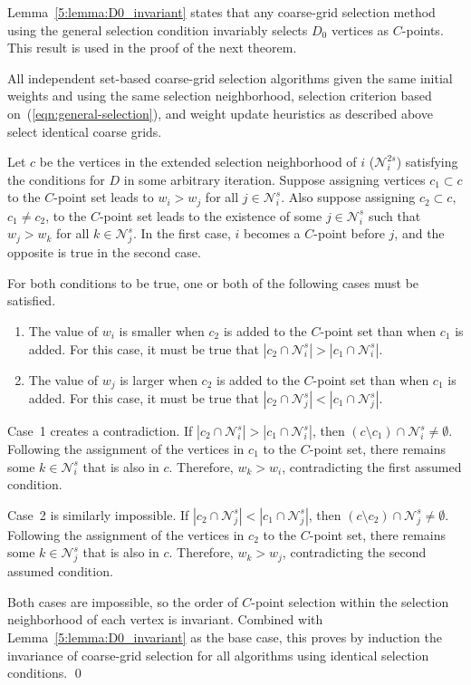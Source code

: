 \documentclass{elsart}
\newenvironment{proof}{\begin{pf}}{\qed\end{pf}}
\begin{document}
Lemma~\ref{5:lemma:D0_invariant} states that any coarse-grid selection
method using the general selection condition invariably selects $D_0$
vertices as $C$-points. This result is used in the proof of the next
theorem.

\begin{thm}
\label{5:theorem:invariance}
All independent set-based coarse-grid selection algorithms given the
same initial weights and using the same selection neighborhood,
selection criterion based on~(\ref{eqn:general-selection}), and weight
update heuristics as described above select identical coarse grids.
\end{thm}
\begin{proof}
Let $c$ be the vertices in the extended selection neighborhood of $i$
($\mathcal{N}_i^{2s}$) satisfying the conditions for $D$ in some
arbitrary iteration. Suppose assigning vertices $c_1 \subset c$ to the
$C$-point set leads to $w_i > w_j$ for all $j \in
\mathcal{N}_i^s$. Also suppose assigning $c_2 \subset c$, $c_1 \ne
c_2$, to the $C$-point set leads to the existence of some $j \in
\mathcal{N}_i^s$ such that $w_j > w_k$ for all $k \in
\mathcal{N}_j^s$. In the first case, $i$ becomes a $C$-point before
$j$, and the opposite is true in the second case.

For both conditions to be true, one or both of the following cases
must be satisfied.
\begin{enumerate}
\item The value of $w_i$ is smaller when $c_2$ is added to the
  $C$-point set than when $c_1$ is added. For this case, it must be
  true that $|c_2 \cap \mathcal{N}_i^s| > |c_1 \cap \mathcal{N}_i^s|$.
\item The value of $w_j$ is larger when $c_2$ is added to the
  $C$-point set than when $c_1$ is added. For this case, it must be
  true that $|c_2 \cap \mathcal{N}_j^s| < |c_1 \cap
  \mathcal{N}_j^s|$.
\end{enumerate}

Case~1 creates a contradiction. If $|c_2 \cap \mathcal{N}_i^s| > |c_1
\cap \mathcal{N}_i^s|$, then $(c \setminus c_1) \cap \mathcal{N}_i^s
\ne \emptyset$. Following the assignment of the vertices in $c_1$ to
the $C$-point set, there remains some $k \in \mathcal{N}_i^s$ that is
also in $c$. Therefore, $w_k > w_i$, contradicting the first assumed
condition.

Case~2 is similarly impossible. If $|c_2 \cap \mathcal{N}_j^s| < |c_1
\cap \mathcal{N}_j^s|$, then $(c \setminus c_2) \cap \mathcal{N}_j^s
\ne \emptyset$. Following the assignment of the vertices in $c_2$ to
the $C$-point set, there remains some $k \in \mathcal{N}_j^s$ that is
also in $c$. Therefore, $w_k > w_j$, contradicting the second assumed
condition.

Both cases are impossible, so the order of $C$-point selection within
the selection neighborhood of each vertex is invariant. Combined with
Lemma~\ref{5:lemma:D0_invariant} as the base case, this proves by
induction the invariance of coarse-grid selection for all algorithms
using identical selection conditions.
\end{proof}
\end{document}
